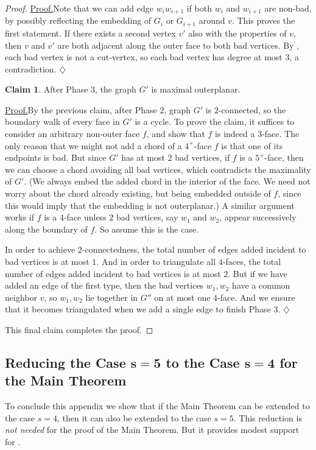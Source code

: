 \documentclass[11pt]{article}
\theoremstyle{definition}
\newtheorem{clmA}{Claim}
\newenvironment{clmproof}[1]{\par\noindent\underline{Proof.}\space#1}{\leavevmode\unskip\penalty9999\hbox{}\nobreak\hfill\quad\hbox{$\diamondsuit$}\smallskip}
\begin{document}
\begin{proof}
\begin{clmproof}
		Note that we can add edge $w_iw_{i+1}$ if both $w_i$ and $w_{i+1}$ are non-bad, by possibly reflecting the embedding of $G_i$ or $G_{i+1}$
		around $v$.  This proves the first statement.  If there exists a second vertex $v'$ also with the properties of $v$, then $v$ and $v'$ 
		are both adjacent along the outer face to both bad vertices.  By , each bad vertex is not a cut-vertex, so each bad vertex
		has degree at most $3$, a contradiction.
	\end{clmproof}
    \begin{clmA}
    \label{subclaim4}
    	After Phase 3, the graph $G'$ is maximal outerplanar.
    \end{clmA}  
    \begin{clmproof}
		By the previous claim, after Phase 2, graph $G'$ is $2$-connected, so the boundary walk of every face in $G'$ is a cycle.  
		To prove the claim, it suffices to 
		consider an arbitrary non-outer face $f$, and show that $f$ is indeed a $3$-face.  The only reason that we might not add a chord of a 
		$4^+$-face $f$ is that one of its endpoints is bad.  But since $G'$ has at most $2$ bad vertices, if $f$ is a $5^+$-face, then we can 
		choose a chord avoiding all bad vertices, which contradicts the maximality of $G'$.  (We always embed the added chord in the interior of 
		the face.  We need not worry about the chord already existing, but being embedded outside of $f$, since this would imply that the 
		embedding is not 
		outerplanar.)  A similar argument works if $f$ is a $4$-face unless $2$ bad vertices, say $w_1$ and $w_2$, appear successively along the 
		boundary of $f$.  So assume this is the case.

		In order to achieve $2$-connectedness, the total number of edges added incident to bad vertices is at most $1$.
		And in order to triangulate all $4$-faces, the total number of edges added incident to bad vertices is at most $2$.
		But if we have added an edge of the first type, then the bad vertices $w_1,w_2$ have a common neighbor $v$, so $w_1,w_2$ lie together
		in $G''$ on at most one $4$-face.  And we ensure that it becomes triangulated when we add a single edge to finish Phase 3.
    \end{clmproof}

    This final claim completes the proof.
\end{proof}

\subsection*{Reducing the Case $\bm{s=5}$ to the Case $\bm{s=4}$ for the Main Theorem}
To conclude this appendix we show that if the Main Theorem can be extended to the case $s=4$, then it can also be extended to the case $s=5$.  This reduction is \emph{not needed} for the
proof of the Main Theorem.  But it provides modest support for .
\end{document}
